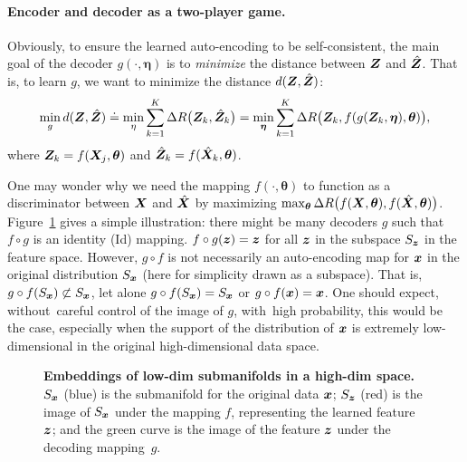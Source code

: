 \documentclass[../../book-main.tex]{subfiles}
\begin{document}
\paragraph{Encoder and decoder as a two-player game.}
Obviously, to ensure the learned auto-encoding to be self-consistent,  the main goal of the decoder $g(\cdot, \bm \eta)$ is to {\em minimize} the distance between $\bm{Z}$ and $\hat {\bm{Z}}$. That is, to learn $g$, we want to minimize the distance $d(\bm{Z}, \hat {\bm{Z}})$:
\begin{equation}
\min_g d(\bm{Z}, \hat {\bm{Z}}) \doteq \min_\eta  \sum_{k=1}^K \Delta R\big(\bm{Z}_k, \hat{\bm{Z}}_k\big) =  \min_{\bm \eta}  \sum_{k=1}^K \Delta R\big(\bm{Z}_k, f(g(\bm{Z}_k, \bm \eta),\bm \theta)\big),
\label{eqn:min-distance}
\end{equation}
where $\bm{Z}_k = f(\bm{X}_j,\bm \theta)$ and $\hat {\bm{Z}}_k = f(\hat{\bm{X}}_k,\bm\theta)$. 

\begin{example}
One may wonder why we need the mapping $f(\cdot, \bm \theta)$ to function as a discriminator between $\bm{X}$ and $\hat {\bm{X}}$ by maximizing $\max_{\bm \theta} \Delta R\big(f(\bm{X},\bm \theta), f(\hat {\bm{X}}, \bm \theta)\big)$. Figure~\ref{fig:decoder} gives a simple illustration: there might be many decoders $g$ such that $f\circ g$ is an identity (Id) mapping. $f\circ g(\bm{z}) = \bm{z} $ for all $\bm{z}$ in the subspace $S_{\bm{z}}$ in the feature space. However, $g\circ f$ is not necessarily an auto-encoding map for $\bm{x}$ in the original distribution $S_{\bm{x}}$ (here for simplicity drawn as a subspace). That is, $g\circ f(S_{\bm{x}}) \not\subset S_{\bm{x}}$, let alone $g\circ f(S_{\bm{x}}) = S_{\bm{x}}$ or $g\circ f(\bm{x}) = \bm{x}$. One should expect, without~careful control of the image of $g$, with~high probability, this would be the case, especially when the support of the distribution of $\bm{x}$ is extremely  low-dimensional in the original high-dimensional data space. 
\end{example}
\begin{figure}
\caption{\textbf{{Embeddings} %
 of low-dim submanifolds in a high-dim space.} $S_{\bm{x}}$ (blue) is the submanifold for the original data $\bm{x}$; $S_{\bm{z}}$ (red) is the image of $S_{\bm{x}}$ under the mapping $f$, representing the learned feature $\bm{z}$; and the green curve  is the image of the feature $\bm{z}$ under the decoding \mbox{mapping $g$.} } \label{fig:decoder}
\end{figure} 
\end{document}
